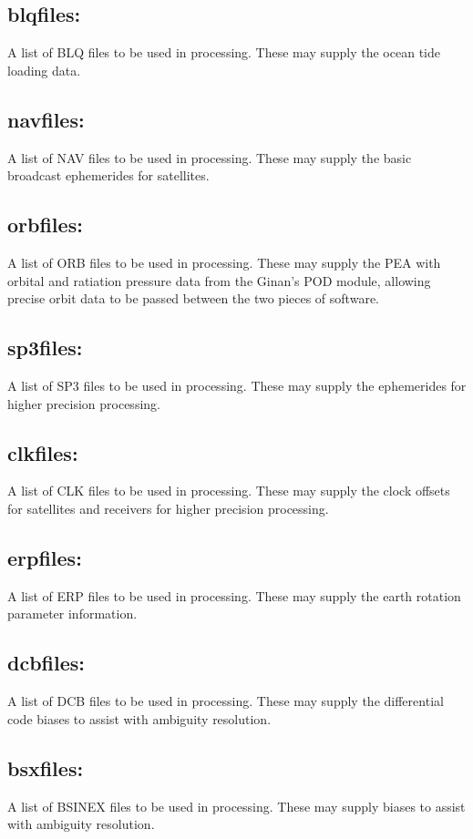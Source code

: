 \subsection*{blqfiles:}
A list of BLQ files to be used in processing. These may supply the ocean tide loading data.

\subsection*{navfiles:}
A list of NAV files to be used in processing. These may supply the basic broadcast ephemerides for satellites.

\subsection*{orbfiles:}
A list of ORB files to be used in processing. These may supply the PEA with orbital and ratiation pressure data from the Ginan's POD module, allowing precise orbit data to be passed between the two pieces of software.

\subsection*{sp3files:}
A list of SP3 files to be used in processing. These may supply the ephemerides for higher precision processing.

\subsection*{clkfiles:}
A list of CLK files to be used in processing. These may supply the clock offsets for satellites and receivers for higher precision processing.

\subsection*{erpfiles:}
A list of ERP files to be used in processing. These may supply the earth rotation parameter information.

\subsection*{dcbfiles:}
A list of DCB files to be used in processing. These may supply the differential code biases to assist with ambiguity resolution.

\subsection*{bsxfiles:}
A list of BSINEX files to be used in processing. These may supply biases to assist with ambiguity resolution.

